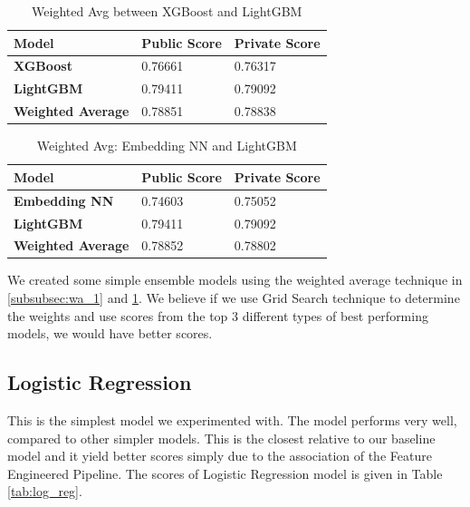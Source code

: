 \documentclass[sigconf, nonacm]{acmart}
\begin{document}
\begin{table}[h]
	\caption{Weighted Avg between XGBoost and LightGBM}
	\label{tab:wa_2}
	\begin{tabular}{@{}|l|l|l|@{}}
		\toprule
		\textbf{Model}            & \textbf{Public Score} & \textbf{Private Score} \\ \midrule
		\textbf{XGBoost}          & 0.76661               & 0.76317                \\ \midrule
		\textbf{LightGBM}         & 0.79411               & 0.79092                \\ \midrule
		\textbf{Weighted Average} & 0.78851               & 0.78838                \\ \bottomrule
	\end{tabular}
\end{table} 

\begin{table}[h]
	\caption{Weighted Avg: Embedding NN and LightGBM}
	\label{tab:wa_1}
	\begin{tabular}{@{}|l|l|l|@{}}
		\toprule
		\textbf{Model}            & \textbf{Public Score} & \textbf{Private Score} \\ \midrule
		\textbf{Embedding NN}     & 0.74603               & 0.75052                \\ \midrule
		\textbf{LightGBM}         & 0.79411               & 0.79092                \\ \midrule
		\textbf{Weighted Average} & 0.78852               & 0.78802                \\ \bottomrule
	\end{tabular}
\end{table} 

We created some simple ensemble models using the weighted average technique in \ref{subsubsec:wa_1} and \ref{tab:wa_2}. We believe if we use Grid Search technique\cite{sklearn.model_selection.gridsearchcv} to determine the weights and use scores from the top 3 different types of best performing models, we would have better scores.

\subsection{Logistic Regression}

This is the simplest model we experimented with. The model performs very well, compared to other simpler models. This is the closest relative to our baseline model and it yield better scores simply due to the association of the Feature Engineered Pipeline. The scores of Logistic Regression model is given in Table \ref{tab:log_reg}.
\end{document}
